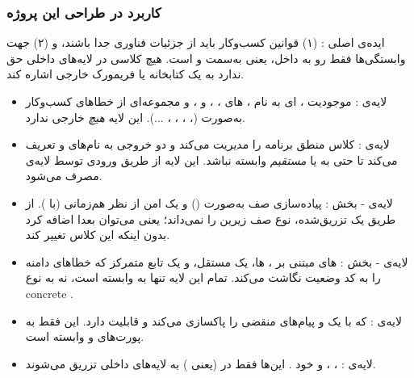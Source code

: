 \subsubsection*{ کاربرد  در طراحی این پروژه}

ایده‌ی اصلی : (۱) قوانین کسب‌وکار باید از جزئیات فناوری جدا باشند، و (۲) جهت وابستگی‌ها فقط رو به داخل، یعنی به‌سمت  و  است. هیچ کلاسی در لایه‌های داخلی حق ندارد به یک کتابخانه یا فریمورک خارجی اشاره کند.

\begin{itemize}
    \item {لایه‌ی :} موجودیت ، ای به نام ، های ، ،  و ، و مجموعه‌ای از خطاهای کسب‌وکار به‌صورت  (، ، ، ، ...). این لایه \emph{هیچ}  خارجی ندارد.
    \item {لایه‌ی :} کلاس  منطق برنامه را مدیریت می‌کند و دو  خروجی به نام‌های  و  تعریف می‌کند تا حتی به  یا  \emph{مستقیم} وابسته نباشد. این لایه از طریق  ورودی  توسط لایه‌ی  مصرف می‌شود.
    \item {لایه‌ی  - بخش :} پیاده‌سازی  صف به‌صورت  () و یک  امن از نظر هم‌زمانی (با ).  از طریق یک  تزریق‌شده، نوع صف زیرین را نمی‌داند؛ یعنی می‌توان بعدا  اضافه کرد بدون اینکه این کلاس تغییر کند.
    \item {لایه‌ی  - بخش :}  های مبتنی بر ، ها، یک  مستقل، و یک تابع متمرکز  که خطاهای دامنه را به کد وضعیت  نگاشت می‌کند. تمام این لایه تنها به   وابسته است، نه به نوع concrete .
    \item {لایه‌ی :}  که با یک  و  پیام‌های منقضی را پاکسازی می‌کند و قابلیت  دارد. این  فقط به پورت‌های  و  وابسته است.
    \item {لایه‌ی :} ، ،  و خود . این‌ها فقط در  (یعنی ) به لایه‌های داخلی تزریق می‌شوند.
\end{itemize}

